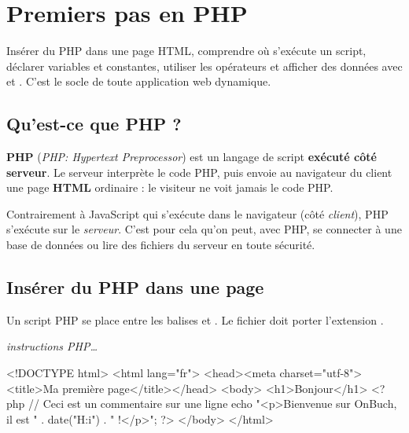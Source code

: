 \chapter{Premiers pas en PHP}

\begin{synthese}[Au programme]
Insérer du PHP dans une page HTML, comprendre où s'exécute un script, déclarer
variables et constantes, utiliser les opérateurs et afficher des données avec
 et . C'est le socle de toute application web dynamique.
\end{synthese}

\section{Qu'est-ce que PHP ?}

\begin{definition}
\textbf{PHP} (\emph{PHP: Hypertext Preprocessor}) est un langage de script
\textbf{exécuté côté serveur}. Le serveur interprète le code PHP, puis envoie au
navigateur du client une page \textbf{HTML} ordinaire : le visiteur ne voit jamais
le code PHP.
\end{definition}

\begin{remarque}
Contrairement à JavaScript qui s'exécute dans le navigateur (côté \emph{client}),
PHP s'exécute sur le \emph{serveur}. C'est pour cela qu'on peut, avec PHP, se
connecter à une base de données ou lire des fichiers du serveur en toute sécurité.
\end{remarque}

\section{Insérer du PHP dans une page}

Un script PHP se place entre les balises  et . Le fichier doit
porter l'extension .

\begin{syntaxe}
\quad \textit{instructions PHP\dots}\quad {}
\end{syntaxe}

\begin{codephp}
<!DOCTYPE html>
<html lang="fr">
<head><meta charset="utf-8"><title>Ma première page</title></head>
<body>
  <h1>Bonjour</h1>
  <?php
    // Ceci est un commentaire sur une ligne
    echo "<p>Bienvenue sur OnBuch, il est " . date("H:i") . " !</p>";
  ?>
</body>
</html>
\end{codephp}


